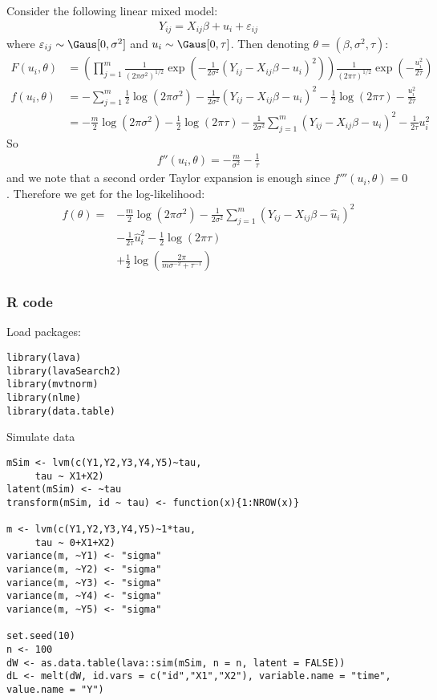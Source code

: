 \documentclass[12pt]{article}
\begin{document}
Consider the following linear mixed model:
\begin{align*}
Y_{ij} = X_{ij} \beta + u_i + \varepsilon_{ij} 
\end{align*}
where \(\varepsilon_{ij} \sim \Gaus[0,\sigma^2]\) and \(u_i \sim
\Gaus[0,\tau]\). Then denoting \(\theta = (\beta,\sigma^2,\tau)\):
\begin{align*}
F(u_i,\theta) &= \left( \prod_{j=1}^m \frac{1}{(2\pi \sigma^2)^{1/2}} \exp\left(-\frac{1}{2\sigma^2} (Y_{ij}-X_{ij}\beta-u_i)^2 \right) \right)
 \frac{1}{(2\pi \tau)^{1/2}} \exp\left(-\frac{u_i^2}{2\tau} \right) \\
f(u_i,\theta) &= - \sum_{j=1}^m \frac{1}{2} \log(2\pi \sigma^2) -\frac{1}{2\sigma^2} (Y_{ij}-X_{ij}\beta-u_i)^2 
- \frac{1}{2} \log(2\pi \tau) -\frac{u_i^2}{2\tau} \\
&=  - \frac{m}{2} \log(2\pi \sigma^2) - \frac{1}{2} \log(2\pi \tau) 
- \frac{1}{2\sigma^2} \sum_{j=1}^m (Y_{ij}-X_{ij}\beta-u_i)^2 
- \frac{1}{2\tau} u_i^2 
\end{align*}
So
\begin{align*}
f''(u_i,\theta) = - \frac{m}{\sigma^2} - \frac{1}{\tau} 
\end{align*}
and we note that a second order Taylor expansion is enough since
\(f'''(u_i,\theta)=0\). Therefore we get for the log-likelihood:
\begin{align*}
f(\theta) =
& - \frac{m}{2} \log(2\pi \sigma^2) - \frac{1}{2\sigma^2} \sum_{j=1}^m (Y_{ij}-X_{ij}\beta-\hat{u}_i)^2  \\
& - \frac{1}{2\tau} \hat{u}_i^2 - \frac{1}{2} \log(2\pi \tau) \\
& + \frac{1}{2} \log\left(\frac{2 \pi}{m\sigma^{-2} + \tau^{-1}}\right) 
\end{align*}

\clearpage 

\subsubsection{R code}
\label{sec:orgcfc9ade}

Load packages:
\lstset{language=r,label= ,caption= ,captionpos=b,numbers=none}
\begin{lstlisting}
library(lava)
library(lavaSearch2)
library(mvtnorm)
library(nlme)
library(data.table)
\end{lstlisting}

Simulate data
\lstset{language=r,label= ,caption= ,captionpos=b,numbers=none}
\begin{lstlisting}
mSim <- lvm(c(Y1,Y2,Y3,Y4,Y5)~tau,
	 tau ~ X1+X2)
latent(mSim) <- ~tau
transform(mSim, id ~ tau) <- function(x){1:NROW(x)}

m <- lvm(c(Y1,Y2,Y3,Y4,Y5)~1*tau,
	 tau ~ 0+X1+X2)
variance(m, ~Y1) <- "sigma"
variance(m, ~Y2) <- "sigma"
variance(m, ~Y3) <- "sigma"
variance(m, ~Y4) <- "sigma"
variance(m, ~Y5) <- "sigma"

set.seed(10)
n <- 100
dW <- as.data.table(lava::sim(mSim, n = n, latent = FALSE))
dL <- melt(dW, id.vars = c("id","X1","X2"), variable.name = "time", value.name = "Y")
\end{lstlisting}
\end{document}
